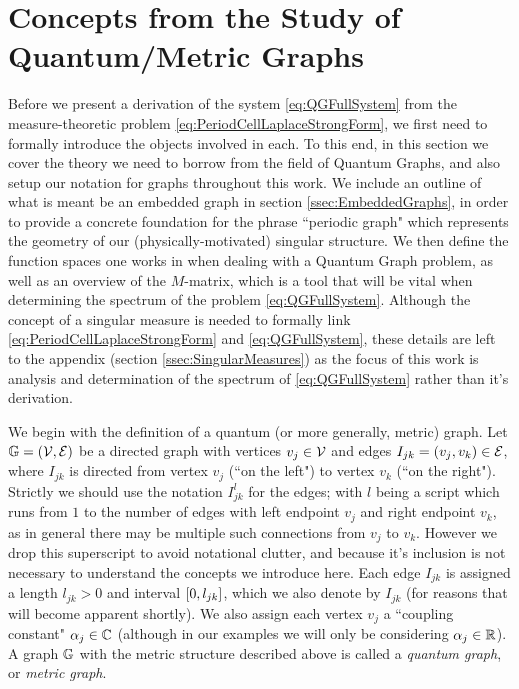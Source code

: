 \section{Concepts from the Study of Quantum/Metric Graphs} \label{sec:QuantumGraphs}
Before we present a derivation of the system \eqref{eq:QGFullSystem} from the measure-theoretic problem \eqref{eq:PeriodCellLaplaceStrongForm}, we first need to formally introduce the objects involved in each.
To this end, in this section we cover the theory we need to borrow from the field of Quantum Graphs, and also setup our notation for graphs throughout this work.
We include an outline of what is meant be an embedded graph in section \ref{ssec:EmbeddedGraphs}, in order to provide a concrete foundation for the phrase ``periodic graph" which represents the geometry of our (physically-motivated) singular structure.
We then define the function spaces one works in when dealing with a Quantum Graph problem, as well as an overview of the $M$-matrix, which is a tool that will be vital when determining the spectrum of the problem \eqref{eq:QGFullSystem}.
Although the concept of a singular measure is needed to formally link \eqref{eq:PeriodCellLaplaceStrongForm} and \eqref{eq:QGFullSystem}, these details are left to the appendix (section \ref{ssec:SingularMeasures}) as the focus of this work is analysis and determination of the spectrum of \eqref{eq:QGFullSystem} rather than it's derivation. \newline

We begin with the definition of a quantum (or more generally, metric) graph.
Let $\mathbb{G}=\left( \mathcal{V},\mathcal{E} \right)$ be a directed graph with vertices $v_j\in \mathcal{V}$ and edges $I_{jk}=\left( v_j, v_k \right)\in \mathcal{E}$, where $I_{jk}$ is directed from vertex $v_j$ (``on the left") to vertex $v_k$ (``on the right").
Strictly we should use the notation $I_{jk}^l$ for the edges; with $l$ being a script which runs from $1$ to the number of edges with left endpoint $v_j$ and right endpoint $v_k$, as in general there may be multiple such connections from $v_j$ to $v_k$.
However we drop this superscript to avoid notational clutter, and because it's inclusion is not necessary to understand the concepts we introduce here.
Each edge $I_{jk}$ is assigned a length $l_{jk}>0$ and interval $\left[ 0,l_{jk} \right]$, which we also denote by $I_{jk}$ (for reasons that will become apparent shortly).
We also assign each vertex $v_j$ a ``coupling constant" $\alpha_j\in\mathbb{C}$ (although in our examples we will only be considering $\alpha_j\in\mathbb{R}$).
A graph $\mathbb{G}$ with the metric structure described above is called a \emph{quantum graph}, or \emph{metric graph}. 


